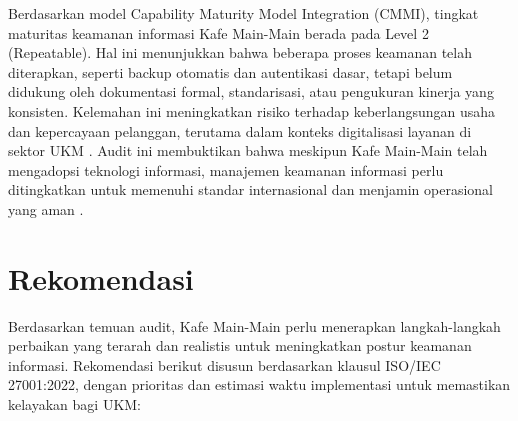 \documentclass[12pt, a4paper]{report}
\begin{document}
Berdasarkan model Capability Maturity Model Integration (CMMI), tingkat maturitas keamanan informasi Kafe Main-Main berada pada Level 2 (Repeatable). Hal ini menunjukkan bahwa beberapa proses keamanan telah diterapkan, seperti backup otomatis dan autentikasi dasar, tetapi belum didukung oleh dokumentasi formal, standarisasi, atau pengukuran kinerja yang konsisten. Kelemahan ini meningkatkan risiko terhadap keberlangsungan usaha dan kepercayaan pelanggan, terutama dalam konteks digitalisasi layanan di sektor UKM \citep{permatasari2023manajemen, ratnasari2021pelindungan}. Audit ini membuktikan bahwa meskipun Kafe Main-Main telah mengadopsi teknologi informasi, manajemen keamanan informasi perlu ditingkatkan untuk memenuhi standar internasional dan menjamin operasional yang aman \citep{frangky2024implementasi}.

\section{Rekomendasi}
Berdasarkan temuan audit, Kafe Main-Main perlu menerapkan langkah-langkah perbaikan yang terarah dan realistis untuk meningkatkan postur keamanan informasi. Rekomendasi berikut disusun berdasarkan klausul ISO/IEC 27001:2022, dengan prioritas dan estimasi waktu implementasi untuk memastikan kelayakan bagi UKM:
\end{document}
